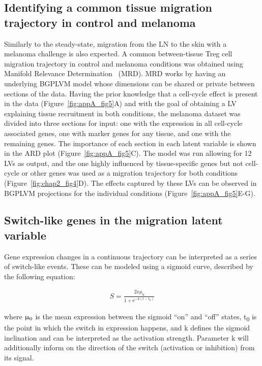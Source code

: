 \subsection{Identifying a common tissue migration trajectory in control and melanoma}
Similarly to the steady-state, migration from the LN to the skin with a melanoma challenge is also expected. A common between-tissue Treg cell migration trajectory in control and melanoma conditions was obtained using Manifold Relevance Determination~\citep{Andreas_Damianou_Carl_Ek_Michalis_Titsias_Neil_Lawrence2012-do} (MRD). MRD works by having an underlying BGPLVM model whose dimensions can be shared or private between sections of the data. Having the prior knowledge that a cell-cycle effect is present in the data (Figure~\ref{fig:appA_fig5}A) and with the goal of obtaining a LV explaining tissue recruitment in both conditions, the melanoma dataset was divided into three sections for input: one with the expression in all cell-cycle associated genes, one with marker genes for any tissue, and one with the remaining genes. The importance of each section in each latent variable is shown in the ARD plot (Figure~\ref{fig:appA_fig5}C). The model was run allowing for 12 LVs as output, and the one highly influenced by tissue-specific genes but not cell-cycle or other genes was used as a migration trajectory for both conditions (Figure~\ref{fig:chap2_fig4}D). The effects captured by these LVs can be observed in BGPLVM projections for the individual conditions (Figure~\ref{fig:appA_fig5}E-G).

\subsection{Switch-like genes in the migration latent variable}
Gene expression changes in a continuous trajectory can be interpreted as a series of switch-like events. These can be modeled using a sigmoid curve, described by the following equation:

\begin{align}
S = \frac{2 x \mu_0}{1 + \mathrm{e}^{-k(t - t_0)}}
\end{align}

where ${\upmu\textsubscript{0}}$ is the mean expression between the sigmoid “on” and “off” states, t\textsubscript{0} is the point in which the switch in expression happens, and k defines the sigmoid inclination and can be interpreted as the activation strength. Parameter k will additionally inform on the direction of the switch (activation or inhibition) from its signal.

